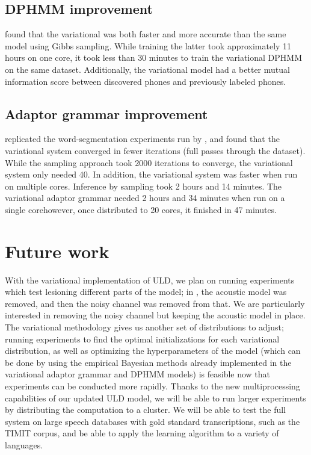 \documentclass[12pt,letterpaper]{article}
\begin{document}
\subsection{DPHMM improvement}
\citet{ondel:2016} found that the variational was both faster and more accurate than the same model using Gibbs sampling. While training the latter took approximately 11 hours on one core, it took less than 30 minutes to train the variational DPHMM on the same dataset. Additionally, the variational model had a better mutual information score between discovered phones and previously labeled phones. 

\subsection{Adaptor grammar improvement}
\citet{cohen:dissertation} replicated the word-segmentation experiments run by \citet{johnson:2009}, and found that the variational system converged in fewer iterations (full passes through the dataset). While the sampling approach took 2000 iterations to converge, the variational system only needed 40. In addition, the variational system was faster when run on multiple cores. Inference by sampling took 2 hours and 14 minutes. The variational adaptor grammar needed 2 hours and 34 minutes when run on a single core\textemdash however, once distributed to 20 cores, it finished in 47 minutes. 

\section{Future work}
With the variational implementation of ULD, we plan on running experiments which test lesioning different parts of the model; in \citet{lee:2015}, the acoustic model was removed, and then the noisy channel was removed from that. We are particularly interested in removing the noisy channel but keeping the acoustic model in place. The variational methodology gives us another set of distributions to adjust; running experiments to find the optimal initializations for each variational distribution, as well as optimizing the hyperparameters of the model (which can be done by using the empirical Bayesian methods already implemented in the variational adaptor grammar and DPHMM models) is feasible now that experiments can be conducted more rapidly. Thanks to the new multiprocessing capabilities of our updated ULD model, we will be able to run larger experiments by distributing the computation to a cluster. We will be able to test the full system on large speech databases with gold standard transcriptions, such as the TIMIT corpus, and be able to apply the learning algorithm to a variety of languages. 
\end{document}
